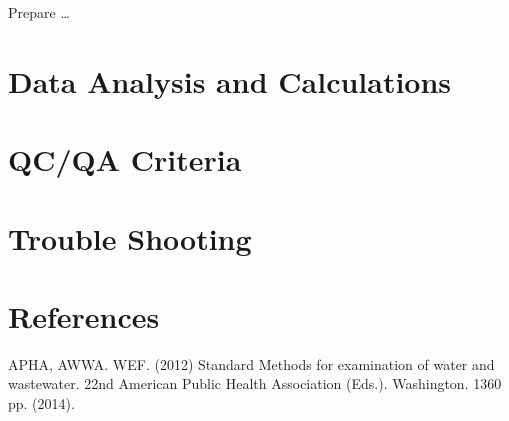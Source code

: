 \documentclass[12pt]{../SOP4_alpha}\usepackage[]{graphicx}\usepackage[]{color}
\begin{document}
\NP Prepare \dots

\NP

\section{Data Analysis and Calculations}

\section{QC/QA Criteria}

\section{Trouble Shooting}

\section{References}

\NP APHA, AWWA. WEF. (2012) Standard Methods for examination of water and wastewater. 22nd American Public Health Association (Eds.). Washington. 1360 pp. (2014).
\end{document}
